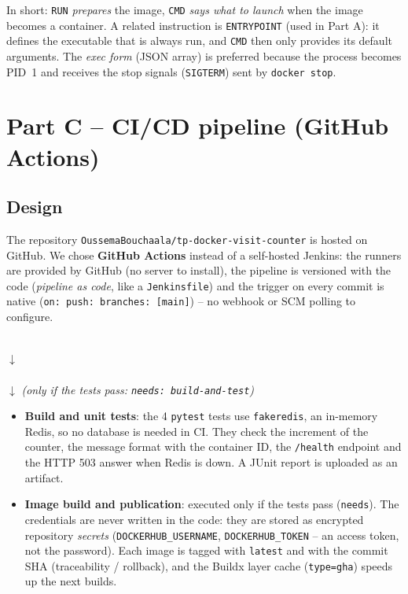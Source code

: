 \documentclass[11pt,a4paper]{article}
\begin{document}
In short: \texttt{RUN} \emph{prepares} the image, \texttt{CMD} \emph{says what to launch}
when the image becomes a container. A related instruction is \texttt{ENTRYPOINT}
(used in Part A): it defines the executable that is always run, and \texttt{CMD} then
only provides its default arguments. The \emph{exec form} (JSON array) is preferred
because the process becomes PID~1 and receives the stop signals (\texttt{SIGTERM}) sent
by \texttt{docker stop}.





\section{Part C -- CI/CD pipeline (GitHub Actions)}

\subsection{Design}
The repository \texttt{OussemaBouchaala/tp-docker-visit-counter} is hosted on GitHub.
We chose \textbf{GitHub Actions} instead of a self-hosted Jenkins: the runners are
provided by GitHub (no server to install), the pipeline is versioned with the code
(\emph{pipeline as code}, like a \texttt{Jenkinsfile}) and the trigger on every commit
is native (\texttt{on: push: branches: [main]}) -- no webhook or SCM polling to configure.

\begin{center}\small
{}\\[0.12cm]
$\downarrow$\\[0.05cm]
\\[0.12cm]
$\downarrow$ \emph{(only if the tests pass: \texttt{needs: build-and-test})}\\[0.05cm]
\end{center}

\begin{itemize}[leftmargin=1.3em]
  \item \textbf{Build and unit tests}: the 4 \texttt{pytest} tests use \texttt{fakeredis},
  an in-memory Redis, so no database is needed in CI. They check the increment of the
  counter, the message format with the container ID, the \texttt{/health} endpoint and
  the HTTP 503 answer when Redis is down. A JUnit report is uploaded as an artifact.
  \item \textbf{Image build and publication}: executed only if the tests pass
  (\texttt{needs}). The credentials are never written in the code: they are stored as
  encrypted repository \emph{secrets} (\texttt{DOCKERHUB\_USERNAME},
  \texttt{DOCKERHUB\_TOKEN} -- an access token, not the password). Each image is tagged
  with \texttt{latest} and with the commit SHA (traceability / rollback), and the
  Buildx layer cache (\texttt{type=gha}) speeds up the next builds.
\end{itemize}
\end{document}
